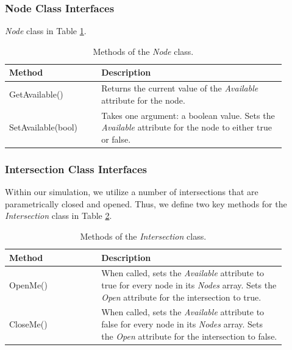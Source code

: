 \documentclass[12pt]{article}
\begin{document}
\subsubsection{Node Class Interfaces}
\textit{Node} class in Table \ref{table:node_methods}.

\def\arraystretch{1.5}
\begin{table}
  \centering
    \begin{tabular}{p{0.3\linewidth}p{0.6\linewidth}}
     \hline
     Method & Description \\
     \hline
     GetAvailable()     & Returns the current value of the \textit{Available}
                          attribute for the node. \\
     SetAvailable(bool) & Takes one argument: a boolean value. Sets the
                          \textit{Available} attribute for the node to either
                          true or false. \\
     \hline
    \end{tabular}
    \caption{Methods of the \textit{Node} class.}
  \label{table:node_methods}
\end{table}

\subsubsection{Intersection Class Interfaces}
Within our simulation, we utilize a number of intersections that are
parametrically closed and opened. Thus, we define two key methods for the
\textit{Intersection} class in Table \ref{table:intersection_methods}.

\def\arraystretch{1.5}
\begin{table}
  \centering
    \begin{tabular}{p{0.3\linewidth}p{0.6\linewidth}}
     \hline
     Method & Description \\
     \hline
     OpenMe()  & When called, sets the \textit{Available} attribute to
                 true for every node in its \textit{Nodes} array. Sets the
                 \textit{Open} attribute for the intersection to true. \\
     CloseMe() & When called, sets the \textit{Available} attribute to
                 false for every node in its \textit{Nodes} array. Sets the
                 \textit{Open} attribute for the intersection to false. \\
     \hline
    \end{tabular}
    \caption{Methods of the \textit{Intersection} class.}
  \label{table:intersection_methods}
\end{table}

{}

\end{document}
